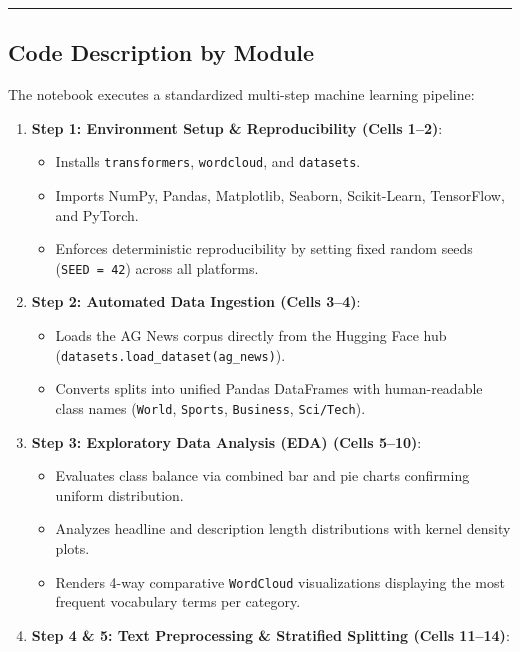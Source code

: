 \documentclass[12pt,a4paper,oneside]{report}
\providecommand{\tightlist}{\setlength{\itemsep}{0pt}\setlength{\parskip}{0pt}}
\begin{document}
\begin{center}\rule{0.5\linewidth}{0.5pt}\end{center}

\hypertarget{code-description-by-module}{%
\subsection{Code Description by Module}\label{code-description-by-module}}

The notebook executes a standardized multi-step machine learning pipeline:

\begin{enumerate}
\def\labelenumi{\arabic{enumi}.}
\tightlist
\item
  \textbf{Step 1: Environment Setup \& Reproducibility (Cells 1--2)}:

  \begin{itemize}
  \tightlist
  \item
    Installs \texttt{transformers}, \texttt{wordcloud}, and \texttt{datasets}.
  \item
    Imports NumPy, Pandas, Matplotlib, Seaborn, Scikit-Learn, TensorFlow, and PyTorch.
  \item
    Enforces deterministic reproducibility by setting fixed random seeds (\texttt{SEED\ =\ 42}) across all platforms.
  \end{itemize}
\item
  \textbf{Step 2: Automated Data Ingestion (Cells 3--4)}:

  \begin{itemize}
  \tightlist
  \item
    Loads the AG News corpus directly from the Hugging Face hub (\texttt{datasets.load\_dataset(\textquotesingle{}ag\_news\textquotesingle{})}).
  \item
    Converts splits into unified Pandas DataFrames with human-readable class names (\texttt{World}, \texttt{Sports}, \texttt{Business}, \texttt{Sci/Tech}).
  \end{itemize}
\item
  \textbf{Step 3: Exploratory Data Analysis (EDA) (Cells 5--10)}:

  \begin{itemize}
  \tightlist
  \item
    Evaluates class balance via combined bar and pie charts confirming uniform distribution.
  \item
    Analyzes headline and description length distributions with kernel density plots.
  \item
    Renders 4-way comparative \texttt{WordCloud} visualizations displaying the most frequent vocabulary terms per category.
  \end{itemize}
\item
  \textbf{Step 4 \& 5: Text Preprocessing \& Stratified Splitting (Cells 11--14)}:


\end{enumerate}
\end{document}
